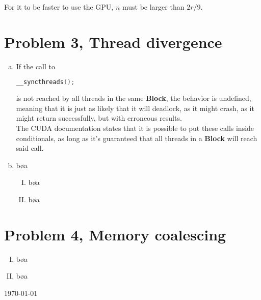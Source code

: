 \documentclass[fontsize=11pt, paper=a4, titlepage]{article}
\begin{document}
For it to be faster to use the GPU, $n$ must be larger than $2r/9$.

\section*{Problem 3, Thread divergence}
\begin{enumerate}[a)]

    \item If the call to
\begin{lstlisting}[language=C, numbers=none]
__syncthreads();
\end{lstlisting}
is not reached by all threads in the same \textbf{Block}, the behavior is
undefined, meaning that it is just as likely that it will deadlock, as it might
crash, as it might return successfully, but with erroneous results. \\

The CUDA documentation states that it is possible to put these calls inside
conditionals, as long as it's guaranteed that all threads in a \textbf{Block}
will reach said call.

    \item bøa

    \begin{enumerate}[I)]

        \item bøa

        \item bøa

    \end{enumerate}
\end{enumerate}

\section*{Problem 4, Memory coalescing}
\begin{enumerate}[I)]

    \item bøa

    \item bøa

\end{enumerate}

\vfill
\hfill \large{\today}
\end{document}
